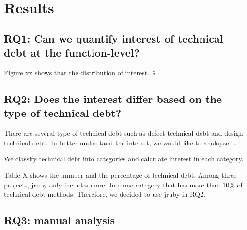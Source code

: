 \documentclass[conference]{IEEEtran}
\begin{document}
\section{Results}
\subsection{RQ1: Can we quantify interest of technical debt at the function-level?}



Figure xx shows that the distribution of interest. X



\subsection{RQ2: Does the interest differ based on the type of technical debt?}
There are several type of technical debt such as defect technical debt and design technical debt. 
To better understand the interest, we would like to analayze ...

We classify technical debt into categories and calculate interest in each category.

Table X shows the number and the percentage of technical debt. Among three projects, jruby only includes more than one category that has more than 10\% of technical debt methods. Therefore, we decided to use jruby in RQ2.



\subsection{RQ3: manual analysis}



\end{document}
